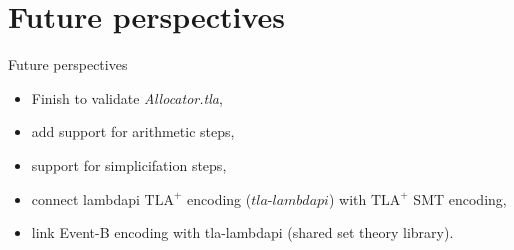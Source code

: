 \documentclass[aspectratio=169,xcolor={dvipsnames}]{beamer}
\begin{document}
\section{Future perspectives}

\begin{frame}{Future perspectives}
    \begin{itemize}
        \item Finish to validate \textit{Allocator.tla},
        \item add support for arithmetic steps,
        \item support for simplicifation steps,
        \item connect lambdapi $\text{TLA}^+$ encoding ($\textit{tla-lambdapi}$) with $\text{TLA}^+$ SMT encoding,
        \item link Event-B encoding with tla-lambdapi (shared set theory library).
    \end{itemize}
\end{frame}
\end{document}
